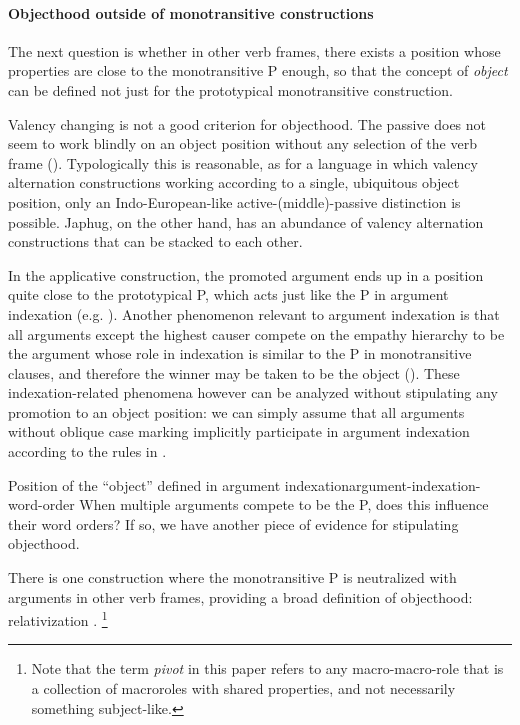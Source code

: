 \documentclass[a4paper, oneside, 12pt]{report}
\newcommand*{\citepage}[1]{p.~{#1}}
\newcommand*{\term}[1]{\emph{#1}}
\begin{document}
\paragraph*{Objecthood outside of monotransitive constructions}
\label{sec:grammatical.clause.internal.object}
The next question is whether in other verb frames,
there exists a position whose properties are close to the monotransitive P enough,
so that the concept of \term{object} can be defined not just for 
the prototypical monotransitive construction. 

Valency changing is not a good criterion for objecthood.
The passive does not seem to work blindly on an object position
without any selection of the verb frame
().
Typologically this is reasonable,
as for a language in which valency alternation constructions 
working according to a single, ubiquitous object position,
only an Indo-European-like active-(middle)-passive distinction is possible.
Japhug, on the other hand, has an abundance of valency alternation constructions
that can be stacked to each other.

In the applicative construction,
the promoted argument ends up in a position quite close to the prototypical P,
which acts just like the P in argument indexation
(e.g. \citealt[\citepage{863}, (102)]{jacques2021grammar}).
Another phenomenon relevant to argument indexation is that
all arguments except the highest causer compete on the empathy hierarchy
to be the argument whose role in indexation is similar to the P in monotransitive clauses,
and therefore the winner may be taken to be the object
().
These indexation-related phenomena however can be analyzed without stipulating 
any promotion to an object position:
we can simply assume that all arguments without oblique case marking
implicitly participate in argument indexation 
according to the rules in .

\begin{todobox}{Position of the ``object'' defined in argument indexation}{argument-indexation-word-order}
    When multiple arguments compete to be the P,
    does this influence their word orders?
    If so, we have another piece of evidence for stipulating objecthood.
\end{todobox}

There is one construction where the monotransitive P is neutralized with
arguments in other verb frames, providing a broad definition of objecthood:
relativization \citep{jacques2016subjects}.%
\footnote{
    Note that the term \term{pivot} in this paper refers to 
    any macro-macro-role that is a collection of macroroles with shared properties,
    and not necessarily something subject-like.
}
\end{document}
